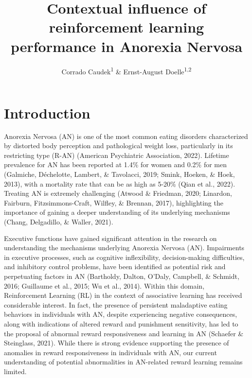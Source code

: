 \documentclass[
  man,floatsintext]{apa6}
\title{Contextual influence of reinforcement learning performance in Anorexia Nervosa}
\author{Corrado Caudek\textsuperscript{1} \& Ernst-August Doelle\textsuperscript{1,2}}
\date{}
\affiliation{\vspace{0.5cm}\textsuperscript{1} Wilhelm-Wundt-University\\\textsuperscript{2} Konstanz Business School}
\begin{document}
\maketitle

\hypertarget{introduction}{%
\section{Introduction}\label{introduction}}

Anorexia Nervosa (AN) is one of the most common eating disorders characterized by distorted body perception and pathological weight loss, particularly in its restricting type (R-AN) (American Psychiatric Association, 2022). Lifetime prevalence for AN has been reported at 1.4\% for women and 0.2\% for men (Galmiche, Déchelotte, Lambert, \& Tavolacci, 2019; Smink, Hoeken, \& Hoek, 2013), with a mortality rate that can be as high as 5-20\% (Qian et al., 2022). Treating AN is extremely challenging (Atwood \& Friedman, 2020; Linardon, Fairburn, Fitzsimmons-Craft, Wilfley, \& Brennan, 2017), highlighting the importance of gaining a deeper understanding of its underlying mechanisms (Chang, Delgadillo, \& Waller, 2021).

Executive functions have gained significant attention in the research on understanding the mechanisms underlying Anorexia Nervosa (AN). Impairments in executive processes, such as cognitive inflexibility, decision-making difficulties, and inhibitory control problems, have been identified as potential risk and perpetuating factors in AN (Bartholdy, Dalton, O'Daly, Campbell, \& Schmidt, 2016; Guillaume et al., 2015; Wu et al., 2014). Within this domain, Reinforcement Learning (RL) in the context of associative learning has received considerable interest. In fact, the presence of persistent maladaptive eating behaviors in individuals with AN, despite experiencing negative consequences, along with indications of altered reward and punishment sensitivity, has led to the proposal of abnormal reward responsiveness and learning in AN (Schaefer \& Steinglass, 2021). While there is strong evidence supporting the presence of anomalies in reward responsiveness in individuals with AN, our current understanding of potential abnormalities in AN-related reward learning remains limited.
\end{document}
